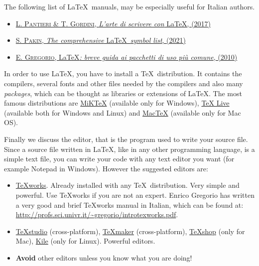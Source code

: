 \documentclass[a5paper,11pt]{article}
\begin{document}
The following list of \LaTeX\ manuals, may be especially useful for Italian authors.

\begin{itemize}
\item \href{http://www.lorenzopantieri.net/LaTeX_files/ArteLaTeX.pdf}{\textsc{L. 
Pantieri \& T. Gordini}, \textit{L'arte di scrivere con} \LaTeX, (2017)}

\item \href{http://mirror.ctan.org/info/symbols/comprehensive/symbols-a4.pdf}{\textsc{S. Pakin}, \textit{The comprehensive} \LaTeX\ \textit{symbol list}, (2021)}

\item \href{http://profs.sci.univr.it/~gregorio/breveguida.pdf}{\textsc{E. Gregorio}, \LaTeX\textit{: breve guida ai pacchetti di uso pi\`u comune}, (2010)}
\end{itemize}

In order to use \LaTeX, you have to install a \TeX\ distribution. It contains the compilers, several fonts and other files needed by the compilers and also many \emph{packages}, which can be thought as libraries or extensions of \LaTeX. The most famous distributions are \href{http://miktex.org/}{MiKTeX} (available only for Windows), \href{http://www.tug.org/texlive/}{TeX Live} (available both for Windows and Linux) and \href{http://www.tug.org/mactex/2011/}{MacTeX} (available only for Mac OS).

Finally we discuss the editor, that is the program used to write your source file. Since a source file written in \LaTeX, like in any other programming language, is a simple text file, you can write your code with any text editor you want (for example Notepad in Windows). However the suggested editors are:
\begin{itemize}
\item \href{http://tug.org/texworks/}{TeXworks}. Already installed with any \TeX\ distribution. Very simple and powerful. Use TeXworks if you are not an expert. Enrico Gregorio has written a very good and brief TeXworks manual in Italian, which can be found at: {\small \url{http://profs.sci.univr.it/~gregorio/introtexworks.pdf}}.

\item \href{http://texstudio.sourceforge.net/}{TeXstudio} (cross-platform), \href{http://www.xm1math.net/texmaker/}{TeXmaker} (cross-platform), \href{http://pages.uoregon.edu/koch/texshop/}{TeXshop} (only for Mac), \href{http://kile.sourceforge.net/}{Kile} (only for Linux). Powerful editors.

\item \textbf{Avoid} other editors unless you know what you are doing!

\end{itemize}
\end{document}
